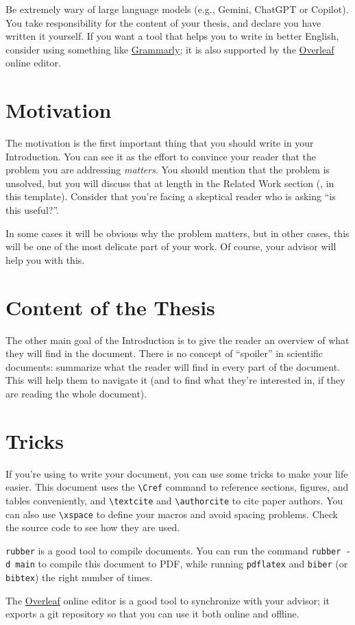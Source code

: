 Be extremely wary of large language models (e.g., Gemini, ChatGPT or Copilot). You take
responsibility for the content of your thesis, and declare you have written it yourself.
If you want a tool that helps you to write in better English, consider using something like
\href{https://grammarly.com}{Grammarly}; it is also supported by the
\href{https://www.overleaf.com}{Overleaf} online \latex editor.

\section{Motivation}

The motivation is the first important thing that you should write in your Introduction.
You can see it as the effort to convince your reader that the problem you are addressing
\emph{matters}. You should mention that the problem is unsolved, but you will discuss that at
length in the Related Work section (, in this template). Consider that
you're facing a skeptical reader who is asking ``is this useful?''.

In some cases it will be obvious why the problem matters, but in other cases, this will be
one of the most delicate part of your work. Of course, your advisor will help you with this.

\section{Content of the Thesis}

The other main goal of the Introduction is to give the reader an overview of what they will
find in the document. There is no concept of ``spoiler'' in scientific documents: summarize
what the reader will find in every part of the document. This will help them to navigate it
(and to find what they're interested in, if they are reading the whole document).

\section{\latex Tricks}

If you're using \latex to write your document, you can use some tricks to make your life
easier. This document uses the \verb|\Cref| command to reference sections, figures, and tables conveniently, and \verb|\textcite| and
\verb|\authorcite| to cite paper authors. You can also use \verb|\xspace| to define your macros
and avoid spacing problems. Check the source code to see how they are used.

\texttt{rubber} is a good tool to compile \latex documents. You can run the command
\texttt{rubber -d main} to compile this document to PDF, while running \texttt{pdflatex}
and \texttt{biber} (or \texttt{bibtex}) the right number of times.

The \href{https://www.overleaf.com}{Overleaf} online editor is a good tool to synchronize with
your advisor; it exports a git repository so that you can use it both online and offline.

